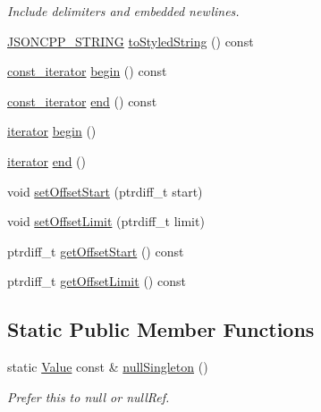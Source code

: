 \begin{DoxyCompactItemize}
\begin{DoxyCompactList}\small\item\em Include delimiters and embedded newlines. \end{DoxyCompactList}\item 
\hyperlink{json_8h_a1e723f95759de062585bc4a8fd3fa4be_a1e723f95759de062585bc4a8fd3fa4be}{J\+S\+O\+N\+C\+P\+P\+\_\+\+S\+T\+R\+I\+NG} \hyperlink{classJson_1_1Value_a00154cc8662d7a845ed59e175c2496cb_a00154cc8662d7a845ed59e175c2496cb}{to\+Styled\+String} () const
\item 
\hyperlink{classJson_1_1Value_af92282ca92b58b320debd486afb7696a_af92282ca92b58b320debd486afb7696a}{const\+\_\+iterator} \hyperlink{classJson_1_1Value_a015459a3950c198d63a2d3be8f5ae296_a015459a3950c198d63a2d3be8f5ae296}{begin} () const
\item 
\hyperlink{classJson_1_1Value_af92282ca92b58b320debd486afb7696a_af92282ca92b58b320debd486afb7696a}{const\+\_\+iterator} \hyperlink{classJson_1_1Value_a3e443cd0ef24f7e028b175e47ee045e0_a3e443cd0ef24f7e028b175e47ee045e0}{end} () const
\item 
\hyperlink{classJson_1_1Value_a341cdf2e01f8b3c5b7317aa2f0768c53_a341cdf2e01f8b3c5b7317aa2f0768c53}{iterator} \hyperlink{classJson_1_1Value_a2d45bb2e68e8f22fe356d7d955ebd3c9_a2d45bb2e68e8f22fe356d7d955ebd3c9}{begin} ()
\item 
\hyperlink{classJson_1_1Value_a341cdf2e01f8b3c5b7317aa2f0768c53_a341cdf2e01f8b3c5b7317aa2f0768c53}{iterator} \hyperlink{classJson_1_1Value_a2f961eff73f7f79cd29260b6cbd42558_a2f961eff73f7f79cd29260b6cbd42558}{end} ()
\item 
void \hyperlink{classJson_1_1Value_a92e32ea0f4f8a15853a3cf0beac9feb9_a92e32ea0f4f8a15853a3cf0beac9feb9}{set\+Offset\+Start} (ptrdiff\+\_\+t start)
\item 
void \hyperlink{classJson_1_1Value_a5e4f5853fec138150c5df6004a8c2bcf_a5e4f5853fec138150c5df6004a8c2bcf}{set\+Offset\+Limit} (ptrdiff\+\_\+t limit)
\item 
ptrdiff\+\_\+t \hyperlink{classJson_1_1Value_afa081dc764000951a1d8d6148155508e_afa081dc764000951a1d8d6148155508e}{get\+Offset\+Start} () const
\item 
ptrdiff\+\_\+t \hyperlink{classJson_1_1Value_a2cdfa01935f87fcace90d450cbd2c0a4_a2cdfa01935f87fcace90d450cbd2c0a4}{get\+Offset\+Limit} () const
\end{DoxyCompactItemize}
\subsection*{Static Public Member Functions}
\begin{DoxyCompactItemize}
\item 
static \hyperlink{classJson_1_1Value}{Value} const  \& \hyperlink{classJson_1_1Value_af2f124567acc35d021a424e53ebdfcab_af2f124567acc35d021a424e53ebdfcab}{null\+Singleton} ()
\begin{DoxyCompactList}\small\item\em Prefer this to null or null\+Ref. \end{DoxyCompactList}\end{DoxyCompactItemize}
